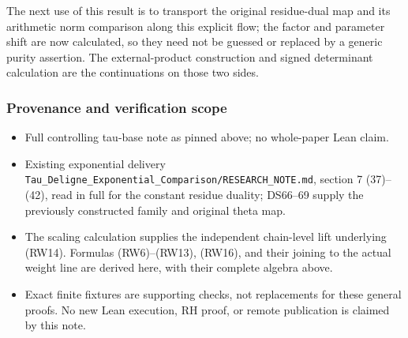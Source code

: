 The next use of this result is to transport the original residue-dual map and its arithmetic norm comparison along this explicit flow; the factor and parameter shift are now calculated, so they need not be guessed or replaced by a generic purity assertion. The external-product construction and signed determinant calculation are the continuations on those two sides.

\subsubsection{Provenance and verification scope}\label{endpoint-f1_reflection--provenance-and-verification-scope}

\begin{itemize}
\tightlist
\item
  Full controlling tau-base note as pinned above; no whole-paper Lean claim.
\item
  Existing exponential delivery \texttt{Tau\_Deligne\_Exponential\_Comparison/RESEARCH\_NOTE.md}, section 7 (37)--(42), read in full for the constant residue duality; DS66--69 supply the previously constructed family and original theta map.
\item
  The scaling calculation supplies the independent chain-level lift underlying (RW14). Formulas (RW6)--(RW13), (RW16), and their joining to the actual weight line are derived here, with their complete algebra above.
\item
  Exact finite fixtures are supporting checks, not replacements for these general proofs. No new Lean execution, RH proof, or remote publication is claimed by this note.
\end{itemize}
